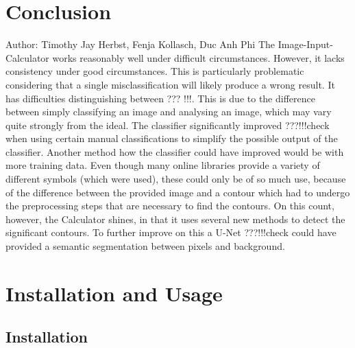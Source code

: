 \documentclass[12pt]{article}
\begin{document}
	\section{Conclusion}
		\small{Author: Timothy Jay Herbst, Fenja Kollasch, Duc Anh Phi} \newline \newline
	The Image-Input-Calculator works reasonably well under difficult circumstances.
	However, it lacks consistency under good circumstances.
	This is particularly problematic considering that a single misclassification will likely produce a wrong result.
	It has difficulties distinguishing between ??? !!!.
	This is due to the difference between simply classifying an image and analysing an image, which may vary quite strongly from the ideal.
	The classifier significantly improved ???!!!check when using certain manual classifications to simplify the possible output of the classifier.
	Another method how the classifier could have improved would be with more training data.
	Even though many online libraries provide a variety of different symbols (which were used), these could only be of so much use, because of the difference between the provided image and a contour which had to undergo the preprocessing steps that are necessary to find the contours.
	On this count, however, the Calculator shines, in that it uses several new methods to detect the significant contours.
	To further improve on this a U-Net ???!!!check could have provided a semantic segmentation between pixels and background.
	
	
	\pagebreak
	\section{Installation and Usage}
	\subsection{Installation}
	
\end{document}
